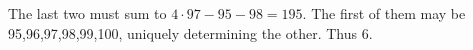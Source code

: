 The last two must sum to $4\cdot97-95-98=195$. The first of them may be 95,96,97,98,99,100, uniquely determining the other. Thus $\boxed6$.
